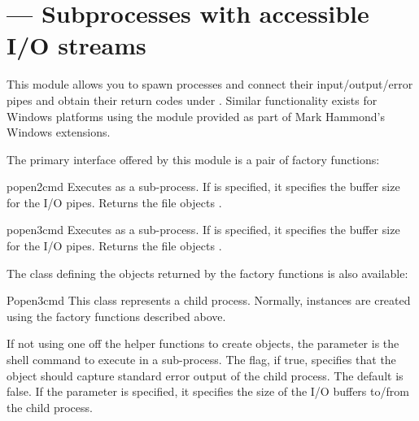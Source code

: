 \section{ ---
         Subprocesses with accessible I/O streams}



This module allows you to spawn processes and connect their 
input/output/error pipes and obtain their return codes under \UNIX.
Similar functionality exists for Windows platforms using the
 module provided as part of Mark Hammond's Windows
extensions.

The primary interface offered by this module is a pair of factory
functions:

\begin{funcdesc}{popen2}{cmd}
Executes  as a sub-process.  If  is specified, 
it specifies the buffer size for the I/O pipes.  Returns the file
objects .
\end{funcdesc}

\begin{funcdesc}{popen3}{cmd}
Executes  as a sub-process.  If  is specified, 
it specifies the buffer size for the I/O pipes.  Returns the file
objects .
\end{funcdesc}

The class defining the objects returned by the factory functions is
also available:

\begin{classdesc}{Popen3}{cmd}
This class represents a child process.  Normally, 
instances are created using the factory functions described above.

If not using one off the helper functions to create 
objects, the parameter  is the shell command to execute in a
sub-process.  The  flag, if true, specifies that
the object should capture standard error output of the child process.
The default is false.  If the  parameter is specified, it
specifies the size of the I/O buffers to/from the child process.
\end{classdesc}


